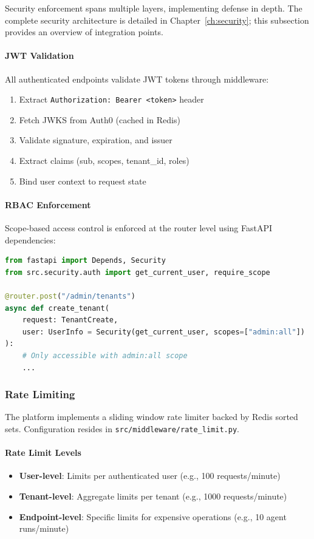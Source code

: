 Security enforcement spans multiple layers, implementing defense in depth. The complete security architecture is detailed in Chapter~\ref{ch:security}; this subsection provides an overview of integration points.

\paragraph{JWT Validation}
All authenticated endpoints validate JWT tokens through middleware:
\begin{enumerate}
    \item Extract \texttt{Authorization: Bearer <token>} header
    \item Fetch JWKS from Auth0 (cached in Redis)
    \item Validate signature, expiration, and issuer
    \item Extract claims (sub, scopes, tenant\_id, roles)
    \item Bind user context to request state
\end{enumerate}

\paragraph{RBAC Enforcement}
Scope-based access control is enforced at the router level using FastAPI dependencies:

\begin{lstlisting}[language=Python, caption={Scope-based authorization dependency.}]
from fastapi import Depends, Security
from src.security.auth import get_current_user, require_scope

@router.post("/admin/tenants")
async def create_tenant(
    request: TenantCreate,
    user: UserInfo = Security(get_current_user, scopes=["admin:all"])
):
    # Only accessible with admin:all scope
    ...
\end{lstlisting}

\subsubsection{Rate Limiting}

The platform implements a sliding window rate limiter backed by Redis sorted sets. Configuration resides in \texttt{src/middleware/rate\_limit.py}.

\paragraph{Rate Limit Levels}
\begin{itemize}
    \item \textbf{User-level}: Limits per authenticated user (e.g., 100 requests/minute)
    \item \textbf{Tenant-level}: Aggregate limits per tenant (e.g., 1000 requests/minute)
    \item \textbf{Endpoint-level}: Specific limits for expensive operations (e.g., 10 agent runs/minute)
\end{itemize}

